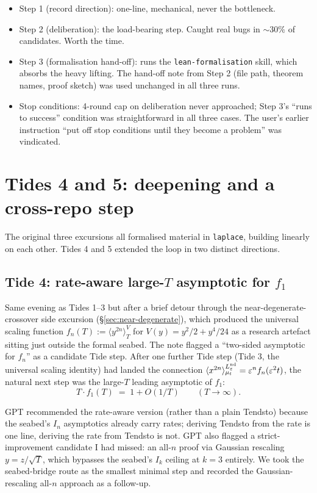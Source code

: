 \documentclass[11pt]{article}
\begin{document}
\begin{itemize}
\item Step 1 (record direction): one-line, mechanical, never the
bottleneck.
\item Step 2 (deliberation): the load-bearing step. Caught real bugs in
$\sim 30\%$ of candidates. Worth the time.
\item Step 3 (formalisation hand-off): runs the
\texttt{lean-formalisation} skill, which absorbs the heavy lifting.
The hand-off note from Step 2 (file path, theorem names, proof
sketch) was used unchanged in all three runs.
\item Stop conditions: 4-round cap on deliberation never approached;
Step 3's ``runs to success'' condition was straightforward in all
three cases. The user's earlier instruction ``put off stop conditions
until they become a problem'' was vindicated.
\end{itemize}

\section{Tides 4 and 5: deepening and a cross-repo step}\label{sec:t4t5}

The original three excursions all formalised material in
\texttt{laplace}, building linearly on each other. Tides 4 and 5
extended the loop in two distinct directions.

\subsection*{Tide 4: rate-aware large-$T$ asymptotic for $f_1$}

Same evening as Tides 1--3 but after a brief detour through the
near-degenerate-crossover side excursion (\S\ref{sec:near-degenerate}),
which produced the universal scaling function $f_n(T) := \langle
y^{2n}\rangle^V_T$ for $V(y) = y^2/2 + y^4/24$ as a research artefact
sitting just outside the formal seabed. The note flagged a
``two-sided asymptotic for $f_n$'' as a candidate Tide step. After one
further Tide step (Tide 3, the universal scaling identity) had landed
the connection $\langle x^{2n}\rangle_{\mu_t}^{L^{\rm nd}_\varepsilon}
= \varepsilon^n f_n(\varepsilon^2 t)$, the natural next step was the
large-$T$ leading asymptotic of $f_1$:
\[
T \cdot f_1(T) \;=\; 1 + O(1/T) \qquad (T \to \infty).
\]

GPT recommended the rate-aware version (rather than a plain Tendsto)
because the seabed's $I_n$ asymptotics already carry rates; deriving
Tendsto from the rate is one line, deriving the rate from Tendsto is
not. GPT also flagged a strict-improvement candidate I had missed: an
all-$n$ proof via Gaussian rescaling $y = z/\sqrt T$, which bypasses
the seabed's $I_k$ ceiling at $k = 3$ entirely. We took the
seabed-bridge route as the smallest minimal step and recorded the
Gaussian-rescaling all-$n$ approach as a follow-up.
\end{document}
